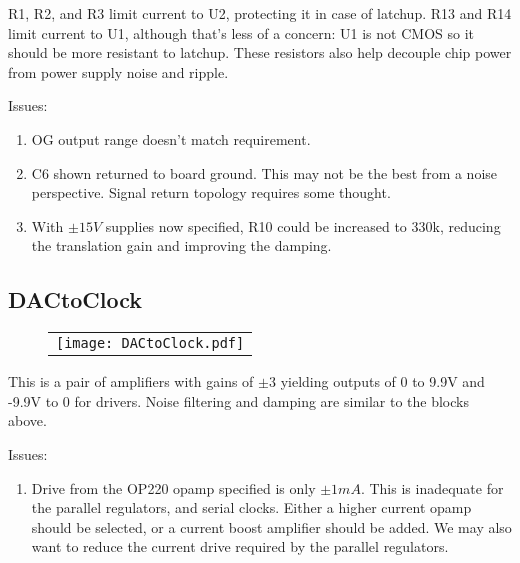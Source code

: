 \documentclass[a4paper,12pt]{article}
\begin{document}
R1, R2, and R3 limit current to U2, protecting it in case of latchup. R13 and R14 limit current to U1, although that's less of a concern: U1 is not CMOS so it should be more resistant to latchup. These resistors also help decouple chip power from power supply noise and ripple.

Issues:
\begin{enumerate}
\item
OG output range doesn't match requirement.
\item
C6 shown returned to board ground. This may not be the best from a noise perspective. Signal return topology requires some thought.
\item
With $\pm15V$ supplies now specified, R10 could be increased to 330k, reducing the translation gain and improving the damping.
\end{enumerate}

\subsection{DACtoClock}

   \begin{figure}
   \begin{center}
   \begin{tabular}{c}
   \texttt{[image: DACtoClock.pdf]}
   \end{tabular}
   \end{center}
   \end{figure}


This is a pair of amplifiers with gains of $\pm3$ yielding outputs of 0 to 9.9V and -9.9V to 0 for drivers. Noise filtering and damping are similar to the blocks above.

Issues:
\begin{enumerate}
\item
Drive from the OP220 opamp specified is only $\pm1 mA$. This is inadequate for the parallel regulators, and serial clocks. Either a higher current opamp should be selected, or a current boost amplifier should be added. We may also want to reduce the current drive required by the parallel regulators.
\end{enumerate}
\end{document}
